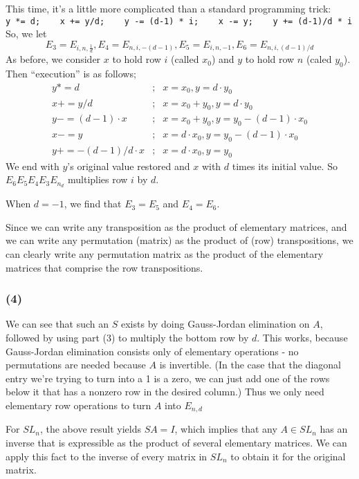 \documentclass{article}
\begin{document}
\medskip
This time, it's a little more complicated than a standard programming trick:\\
\verb|y *= d;    x += y/d;    y -= (d-1) * i;    x -= y;    y += (d-1)/d * i|
So, we let 
\[E_3 = E_{i,n,\frac{1}{d}}, E_4 = E_{n,i,-(d-1)}, E_5 = E_{i,n,-1},
  E_6 = E_{n,i, (d-1)/d} \]
As before, we consider $x$ to hold row $i$ (called $x_0$) and
$y$ to hold row $n$ (caled $y_0$). Then ``execution'' is as follows;
\begin{eqnarray*}
y *= d                &;& x = x_0, y = d\cdot y_0 \\
x += y/d              &;& x = x_0 + y_0, y = d\cdot y_0 \\
y -= (d-1)\cdot x     &;& x = x_0 + y_0, y = y_0 - (d-1) \cdot x_0\\
x -= y                &;& x = d \cdot x_0, y = y_0 - (d-1) \cdot x_0\\ 
y += -(d-1)/d \cdot x &;& x = d \cdot x_0, y = y_0
\end{eqnarray*}
We end with $y$'s original value restored and $x$ with $d$ times its
initial value. So $E_6E_5E_4E_3E_{n_d}$ multiplies row $i$ by $d$.

When $d = -1$, we find that $E_3 = E_5$ and $E_4 = E_6$.

Since we can write any transposition as the product of elementary matrices, and
we can write any permutation (matrix) as the product of (row) transpositions, we
can clearly write any permutation matrix as the product of the elementary
matrices that comprise the row transpositions.

\subsubsection{(4)}
We can see that such an $S$ exists by doing Gauss-Jordan elimination on $A$,
followed by using part (3) to multiply the bottom row by $d$. This works,
because Gauss-Jordan elimination consists only of elementary operations - no
permutations are needed because $A$ is invertible. (In the case that the
diagonal entry we're trying to turn into a 1 is a zero, we can just add one of
the rows below it that has a nonzero row in the desired column.)
Thus we only need elementary row operations to turn $A$ into $E_{n,d}$

\medskip
For $SL_n$, the above result yields $SA = I$, which implies that any
$A \in SL_n$ has an inverse that is expressible as the product of several
elementary matrices. We can apply this fact to the inverse of every matrix in
$SL_n$ to obtain it for the original matrix.
\end{document}
